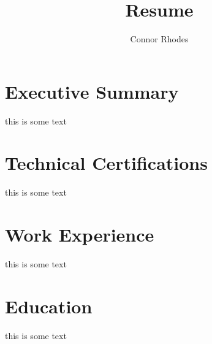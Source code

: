 \documentclass{article}
\author{Connor Rhodes}
\title{Resume}
\begin{document}
\section{Executive Summary}
this is some text

\section{Technical Certifications}
this is some text

\section{Work Experience}
this is some text

\section{Education}

this is some text
\end{document}

